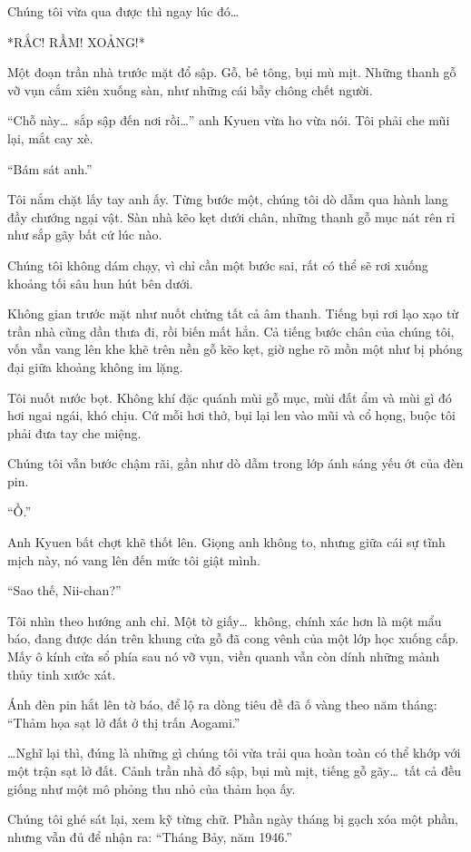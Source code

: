 \documentclass[../main.tex]{subfiles}
\begin{document}
Chúng tôi vừa qua được thì ngay lúc đó\dots

*RẮC! RẦM! XOẢNG!*

Một đoạn trần nhà trước mặt đổ sập. Gỗ, bê tông, bụi mù mịt. Những thanh gỗ vỡ vụn cắm xiên xuống sàn, như những cái bẫy chông chết người.

``Chỗ này\dots\ sắp sập đến nơi rồi\dots'' anh Kyuen vừa ho vừa nói. Tôi phải che mũi lại, mắt cay xè.

``Bám sát anh.''

Tôi nắm chặt lấy tay anh ấy. Từng bước một, chúng tôi dò dẫm qua hành lang đầy chướng ngại vật. Sàn nhà kẽo kẹt dưới chân, những thanh gỗ mục nát rên rỉ như sắp gãy bất cứ lúc nào.

Chúng tôi không dám chạy, vì chỉ cần một bước sai, rất có thể sẽ rơi xuống khoảng tối sâu hun hút bên dưới.

Không gian trước mặt như nuốt chửng tất cả âm thanh. Tiếng bụi rơi lạo xạo từ trần nhà cũng dần thưa đi, rồi biến mất hẳn. Cả tiếng bước chân của chúng tôi, vốn vẫn vang lên khe khẽ trên nền gỗ kẽo kẹt, giờ nghe rõ mồn một như bị phóng đại giữa khoảng không im lặng.

Tôi nuốt nước bọt. Không khí đặc quánh mùi gỗ mục, mùi đất ẩm và mùi gì đó hơi ngai ngái, khó chịu. Cứ mỗi hơi thở, bụi lại len vào mũi và cổ họng, buộc tôi phải đưa tay che miệng.

Chúng tôi vẫn bước chậm rãi, gần như dò dẫm trong lớp ánh sáng yếu ớt của đèn pin.

``Ồ.''

Anh Kyuen bất chợt khẽ thốt lên. Giọng anh không to, nhưng giữa cái sự tĩnh mịch này, nó vang lên đến mức tôi giật mình.

``Sao thế, Nii-chan?''

Tôi nhìn theo hướng anh chỉ. Một tờ giấy\dots\ không, chính xác hơn là một mẩu báo, đang được dán trên khung cửa gỗ đã cong vênh của một lớp học xuống cấp. Mấy ô kính cửa sổ phía sau nó vỡ vụn, viền quanh vẫn còn dính những mảnh thủy tinh xước xát.

Ánh đèn pin hắt lên tờ báo, để lộ ra dòng tiêu đề đã ố vàng theo năm tháng: ``{\vnmsans Thảm họa sạt lở đất ở thị trấn Aogami.}''

\dots Nghĩ lại thì, đúng là những gì chúng tôi vừa trải qua hoàn toàn có thể khớp với một trận sạt lở đất. Cảnh trần nhà đổ sập, bụi mù mịt, tiếng gỗ gãy\dots\ tất cả đều giống như một mô phỏng thu nhỏ của thảm họa ấy.

Chúng tôi ghé sát lại, xem kỹ từng chữ. Phần ngày tháng bị gạch xóa một phần, nhưng vẫn đủ để nhận ra: ``{\arial Tháng Bảy, năm 1946.}''
\end{document}
